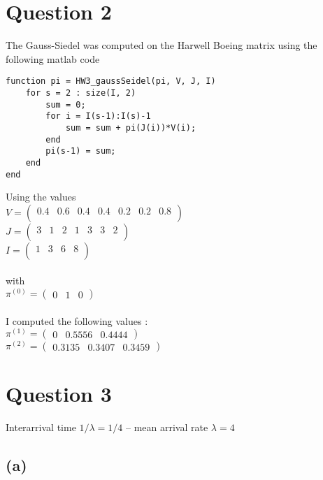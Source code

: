 \documentclass{article}
\begin{document}
\section*{Question 2}
The Gauss-Siedel was computed on the Harwell Boeing matrix using the following
matlab code 
\begin{lstlisting}[frame=single] 
 function pi = HW3_gaussSeidel(pi, V, J, I)
    for s = 2 : size(I, 2)  
        sum = 0;
        for i = I(s-1):I(s)-1
            sum = sum + pi(J(i))*V(i);
        end  
        pi(s-1) = sum;
    end
end 
\end{lstlisting}
Using the values \\
$ V = \left(\begin{array}{ccccccc}
	0.4 & 0.6 & 0.4 & 0.4 & 0.2 & 0.2 & 0.8 \\
\end{array}\right)$\\
$ J    = \left(\begin{array}{ccccccc}
	3 & 1 & 2 & 1 & 3 & 3 & 2 \\
\end{array}\right)$\\
$ I   = \left(\begin{array}{cccc}
	1 & 3 & 6 & 8 \\
\end{array}\right)$\\
\\
with \\
$\pi^{(0)} = \left(\begin{array}{ccc}
	0 & 1 & 0
\end{array}\right)$ \\ 
\\
I computed the following values :\\
$\pi^{(1)} = \left(\begin{array}{ccc}
	0  &  0.5556  &  0.4444
\end{array}\right)$ \\ 
$\pi^{(2)} = \left(\begin{array}{ccc}
0.3135   & 0.3407  &  0.3459
\end{array}\right)$ \\ 

\section*{Question 3}
Interarrival time $1/\lambda = 1/4$ -- mean arrival rate $\lambda = 4$
\subsection*{(a)}	
\end{document}
